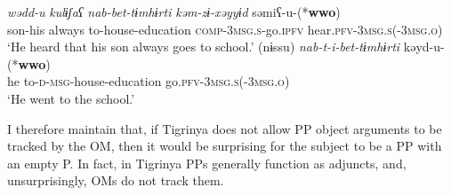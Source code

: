 \documentclass[output=paper]{langscibook}
\begin{document}
\ea\label{ex:Gebregziabher:cp1} 
 \ea
 \gll \textit{wədd-u} \textit{kulɨʃaʕ} \textit{nab-bet-tɨmhɨrti} \textit{kəm-zɨ-xəyyɨd} səmiʕ-u-(*{\textbf{wwo}})\\
 son-his always to-house-education {\scshape comp-3msg.s-}go.{\scshape ipfv} hear.{\scshape pfv-3msg.s(-3msg.o)}\\
 \glt `He heard that his son always goes to school.' 
 \ex\label{ex:Gebregziabher:cp2}
 \gll (nɨssu) \textit{nab-t-i-bet-tɨmhɨrti} kəyd-u-(*{\textbf{wwo}})\\
 he to-{\scshape d-msg}-house-education go.{\scshape pfv-3msg.s(-3msg.o)}\\
 \glt `He went to the school.'
\z
\ex\label{ex:Gebregziabher:pp-1}
\z
\z
 
\noindent I therefore maintain that, if Tigrinya does not allow PP object arguments to be tracked by the OM, then it would be surprising for the subject to be a PP with an empty P. In fact, in Tigrinya PPs generally function as adjuncts, and, unsurprisingly, OMs do not track them.
\end{document}
